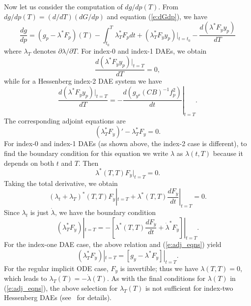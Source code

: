 Now let us consider the computation of ${dg}/{dp}(T)$.
From ${dg}/{dp}(T) = ({d}/{dT})({dG}/{dp})$ and equation (\ref{e:dGdp}), we have
\begin{equation}\label{e:dgdp1}
  \frac{dg}{dp} = (g_p - \lambda^*F_p)(T) - \int_{t_0}^T \lambda^*_TF_p dt + 
  (\lambda^*_T F_{\dot{y}}y_p)|_{t=t_0} - \frac{d(\lambda^*F_{\dot y}y_p)}{dT}
\end{equation}
where $\lambda_T$ denotes ${\partial \lambda}/{\partial T}$. 
For index-0 and index-1 DAEs, we obtain
$$
\frac{d(\lambda^*F_{\dot y}y_p)|_{t=T}}{dT} = 0 ,
$$
while for a Hessenberg index-2 DAE system we have
$$
\frac{d(\lambda^*F_{\dot y}y_p)|_{t=T}}{dT} =
-\left.\frac{d(g_{y^a}(CB)^{-1}f^2_p)}{dt}\right|_{t=T} . 
$$
The corresponding adjoint equations are
\begin{equation} \label{e:adj1_eqns}
  (\lambda^*_TF_{\dot y})'  - \lambda^*_T F_y = 0.
\end{equation}
For index-0 and index-1 DAEs (as shown above, the index-2 case is 
different), to find the boundary condition for this equation we write
$\lambda$ as $\lambda(t, T)$ because it depends on both $t$ and $T$.  Then
$$
\lambda^*(T, T) F_{\dot{y}}|_{t=T}  = 0.
$$
Taking the total derivative, we obtain
$$
(\lambda_t + \lambda_T)^*(T, T) F_{\dot{y}}|_{t=T}  +
\lambda^*(T,T)\frac{dF_{\dot{y}}}{dt}|_{t=T} = 0.
$$
Since $\lambda_t$ is just $\dot \lambda$, we have the boundary condition
\begin{equation*}
  (\lambda_T^* F_{\dot{y}} )|_{t=T}  = -
  \left[
    \lambda^*(T,T)\frac{dF_{\dot{y}}}{dt} +     
    \dot{\lambda}^* F_{\dot{y}} 
  \right] |_{t=T}.
\end{equation*}
For the index-one DAE case, the above relation and (\ref{e:adj_eqns}) yield
\begin{equation}
  (\lambda_T^* F_{\dot{y}} )|_{t=T} = \left[g_y - \lambda^*F_y\right]|_{t=T}.
\end{equation}
For the regular implicit ODE case, $F_{\dot{y}}$ is invertible; thus we have 
$\lambda(T, T) = 0$, which leads to $\lambda_T(T) = - \dot{\lambda}(T)$. 
As with the final conditions for $\lambda(T)$ in (\ref{e:adj_eqns}), the above selection
for $\lambda_T(T)$ is not sufficient for index-two Hessenberg DAEs (see~\cite{CLPS:03} for details).


